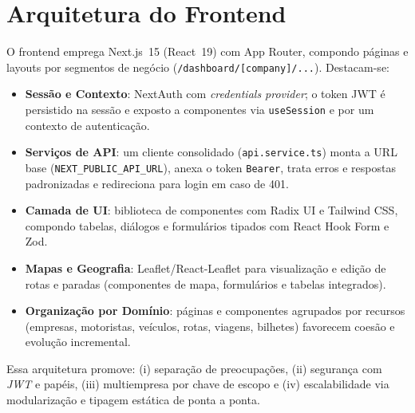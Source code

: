 \section{Arquitetura do Frontend}
O frontend emprega Next.js~15 (React~19) com App Router, compondo páginas e layouts por segmentos de negócio (\texttt{/dashboard/[company]/...}). Destacam-se:

\begin{itemize}
  \item \textbf{Sessão e Contexto}: NextAuth com \textit{credentials provider}; o token JWT é persistido na sessão e exposto a componentes via \texttt{useSession} e por um contexto de autenticação.
  \item \textbf{Serviços de API}: um cliente consolidado (\texttt{api.service.ts}) monta a URL base (\texttt{NEXT\_PUBLIC\_API\_URL}), anexa o token \texttt{Bearer}, trata erros e respostas padronizadas e redireciona para login em caso de 401.
  \item \textbf{Camada de UI}: biblioteca de componentes com Radix UI e Tailwind CSS, compondo tabelas, diálogos e formulários tipados com React Hook Form e Zod.
  \item \textbf{Mapas e Geografia}: Leaflet/React-Leaflet para visualização e edição de rotas e paradas (componentes de mapa, formulários e tabelas integrados).
  \item \textbf{Organização por Domínio}: páginas e componentes agrupados por recursos (empresas, motoristas, veículos, rotas, viagens, bilhetes) favorecem coesão e evolução incremental.
\end{itemize}

Essa arquitetura promove: (i) separação de preocupações, (ii) segurança com \textit{JWT} e papéis, (iii) multiempresa por chave de escopo e (iv) escalabilidade via modularização e tipagem estática de ponta a ponta.
